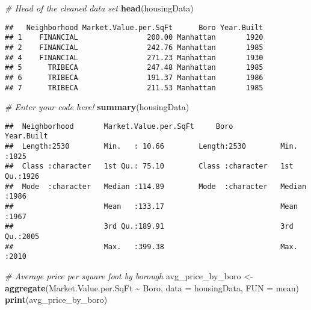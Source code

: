 \documentclass[
]{article}
\newenvironment{Shaded}{\begin{snugshade}}{\end{snugshade}}
\newcommand{\AttributeTok}[1]{\textcolor[rgb]{0.13,0.29,0.53}{#1}}
\newcommand{\CommentTok}[1]{\textcolor[rgb]{0.56,0.35,0.01}{\textit{#1}}}
\newcommand{\FunctionTok}[1]{\textcolor[rgb]{0.13,0.29,0.53}{\textbf{#1}}}
\newcommand{\NormalTok}[1]{#1}
\newcommand{\OtherTok}[1]{\textcolor[rgb]{0.56,0.35,0.01}{#1}}
\newcommand{\SpecialCharTok}[1]{\textcolor[rgb]{0.81,0.36,0.00}{\textbf{#1}}}
\begin{document}
\begin{Shaded}
\begin{Highlighting}[]
\CommentTok{\# Head of the cleaned data set}
\FunctionTok{head}\NormalTok{(housingData)}
\end{Highlighting}
\end{Shaded}

\begin{verbatim}
##   Neighborhood Market.Value.per.SqFt      Boro Year.Built
## 1    FINANCIAL                200.00 Manhattan       1920
## 2    FINANCIAL                242.76 Manhattan       1985
## 4    FINANCIAL                271.23 Manhattan       1930
## 5      TRIBECA                247.48 Manhattan       1985
## 6      TRIBECA                191.37 Manhattan       1986
## 7      TRIBECA                211.53 Manhattan       1985
\end{verbatim}

\begin{Shaded}
\begin{Highlighting}[]
\CommentTok{\# Enter your code here!}
\FunctionTok{summary}\NormalTok{(housingData)}
\end{Highlighting}
\end{Shaded}

\begin{verbatim}
##  Neighborhood       Market.Value.per.SqFt     Boro             Year.Built  
##  Length:2530        Min.   : 10.66        Length:2530        Min.   :1825  
##  Class :character   1st Qu.: 75.10        Class :character   1st Qu.:1926  
##  Mode  :character   Median :114.89        Mode  :character   Median :1986  
##                     Mean   :133.17                           Mean   :1967  
##                     3rd Qu.:189.91                           3rd Qu.:2005  
##                     Max.   :399.38                           Max.   :2010
\end{verbatim}

\begin{Shaded}
\begin{Highlighting}[]
\CommentTok{\# Average price per square foot by borough}
\NormalTok{avg\_price\_by\_boro }\OtherTok{\textless{}{-}} \FunctionTok{aggregate}\NormalTok{(Market.Value.per.SqFt }\SpecialCharTok{\textasciitilde{}}\NormalTok{ Boro, }\AttributeTok{data =}\NormalTok{ housingData, }\AttributeTok{FUN =}\NormalTok{ mean)}
\FunctionTok{print}\NormalTok{(avg\_price\_by\_boro)}
\end{Highlighting}
\end{Shaded}
\end{document}
